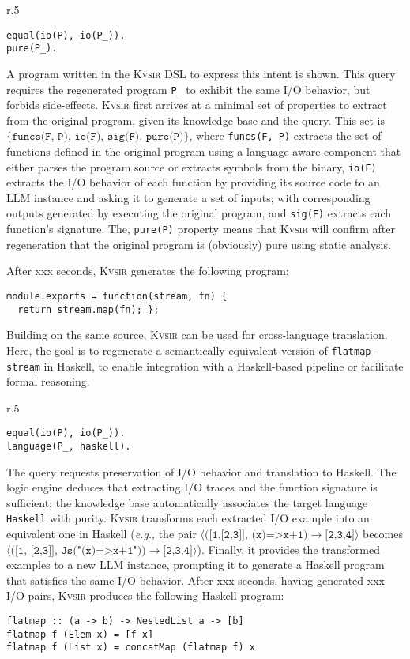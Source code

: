 \documentclass[sigplan]{acmart}
\def\eg{{\em e.g.}, }
\newcommand{\sys}{{\scshape Kv{\textalpha}sir}\xspace}
\newcommand{\ttt}[1]{\texttt{#1}}
\newcommand{\xxx}{\colorbox{red!30}{xxx}\xspace}
\begin{document}
\begin{wrapfigure}[3]{r}{.5\columnwidth}
\vspace{-10pt}
\begin{verbatim}
equal(io(P), io(P_)).
pure(P_).
\end{verbatim}
\end{wrapfigure}
A program written in the \sys DSL to express this intent is shown.
This query requires the regenerated program \ttt{P_} to exhibit the same I/O behavior,
but forbids side-effects.
\sys first arrives at a minimal set of properties to extract from the
original program, given its knowledge base and the query.
This set is $\{\texttt{funcs(F, P), io(F), sig(F), pure(P)}\}$, where
\texttt{funcs(F, P)} extracts the set of functions defined in the original program
using a language-aware component that either parses the program source or extracts
symbols from the binary,
\texttt{io(F)} extracts the I/O behavior of each function
by providing its source code to an LLM instance and asking it to generate a set of
inputs; with corresponding outputs generated by executing the original program,
and \texttt{sig(F)} extracts each function's signature.
The, \texttt{pure(P)} property means that \sys will confirm after regeneration that the original program is (obviously) pure
using static analysis.

After \xxx seconds, \sys generates the following program:
\begin{verbatim}
module.exports = function(stream, fn) {
  return stream.map(fn); };
\end{verbatim}


Building on the same source, \sys can be used for cross-language
translation. 
Here, the goal is to regenerate a semantically equivalent version
of \texttt{flatmap-stream} in Haskell, to enable integration with a
Haskell-based pipeline or facilitate formal reasoning.

\begin{wrapfigure}[3]{r}{.5\columnwidth}
\vspace{-10pt}
\begin{verbatim}
equal(io(P), io(P_)).
language(P_, haskell).
\end{verbatim}
\end{wrapfigure}
The query requests preservation of I/O behavior and translation to Haskell. The
logic engine deduces that extracting I/O traces and the function signature is
sufficient; the knowledge base automatically associates the target language
\texttt{Haskell} with purity.
\sys transforms each extracted I/O example into an equivalent one in Haskell (\eg 
the pair $\langle\texttt{([1,[2,3]], (x)=>x+1)}\to\texttt{[2,3,4]}\rangle$ 
becomes $\langle(\texttt{[1, [2,3]], Js("(x)=>x+1"))}\to\texttt{[2,3,4]}\rangle$).
Finally, it provides the transformed examples to a new LLM instance, prompting it
to generate a Haskell program that satisfies the same I/O behavior.
After \xxx seconds, having generated \xxx I/O pairs, \sys produces the following
Haskell program:
\begin{verbatim}
flatmap :: (a -> b) -> NestedList a -> [b]
flatmap f (Elem x) = [f x]
flatmap f (List x) = concatMap (flatmap f) x
\end{verbatim}
\end{document}
